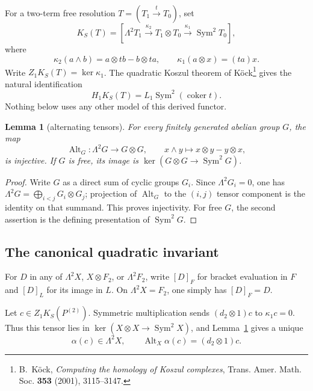 \documentclass[11pt]{amsart}
\newtheorem{lemma}[theorem]{Lemma}
\newcommand{\Sym}{\operatorname{Sym}}
\newcommand{\Alt}{\operatorname{Alt}}
\begin{document}
For a two-term free resolution $T=(T_1\xrightarrow tT_0)$, set
\begin{equation}\label{eq:Koszul}
 K_S(T)=\left[
 \Lambda^2T_1\xrightarrow{\kappa_2}T_1\otimes T_0
 \xrightarrow{\kappa_1}\Sym^2T_0\right],
\end{equation}
where
\[
 \kappa_2(a\wedge b)=a\otimes tb-b\otimes ta,
 \qquad
 \kappa_1(a\otimes x)=(ta)x.
\]
Write $Z_1K_S(T)=\ker\kappa_1$.
The quadratic Koszul theorem of K\"ock\footnote{B.~K\"ock,
\emph{Computing the homology of Koszul complexes}, Trans. Amer. Math.
Soc. \textbf{353} (2001), 3115--3147.} gives the natural identification
\begin{equation}\label{eq:derived-square}
 H_1K_S(T)=L_1\Sym^2(\operatorname{coker}t).
\end{equation}
Nothing below uses any other model of this derived functor.

\begin{lemma}[alternating tensors]\label{lem:Alt}
For every finitely generated abelian group $G$, the map
\[
 \Alt_G:\Lambda^2G\longrightarrow G\otimes G,
 \qquad x\wedge y\longmapsto x\otimes y-y\otimes x,
\]
is injective.  If $G$ is free, its image is
$\ker(G\otimes G\to\Sym^2G)$.
\end{lemma}

\begin{proof}
Write $G$ as a direct sum of cyclic groups $G_i$.  Since
$\Lambda^2G_i=0$, one has
$\Lambda^2G=\bigoplus_{i<j}G_i\otimes G_j$; projection of $\Alt_G$
to the $(i,j)$ tensor component is the identity on that summand.
This proves injectivity.  For free $G$, the second assertion is the
defining presentation of $\Sym^2G$.
\end{proof}

\subsection{The canonical quadratic invariant}

For $D$ in any of $\Lambda^2X$, $X\otimes F_2$, or $\Lambda^2F_2$,
write $[D]_F$ for bracket evaluation in $F$ and $[D]_L$ for its image
in $L$.  On $\Lambda^2X=F_2$, one simply has $[D]_F=D$.

Let $c\in Z_1K_S(P^{(2)})$.  Symmetric multiplication sends
$(d_2\otimes1)c$ to $\kappa_1c=0$.  Thus this tensor lies in
$\ker(X\otimes X\to\Sym^2X)$, and Lemma~\ref{lem:Alt} gives a unique
\begin{equation}\label{eq:alpha}
 \alpha(c)\in\Lambda^2X,
 \qquad
 \Alt_X\alpha(c)=(d_2\otimes1)c.
\end{equation}
\end{document}
